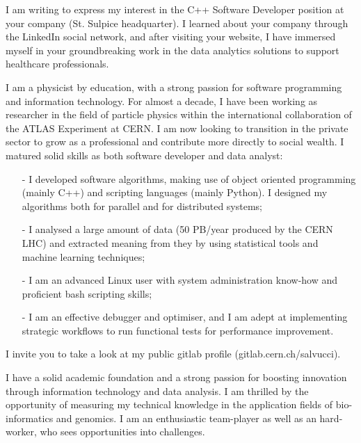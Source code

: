 \documentclass[11pt, a4paper]{\TEXPATH awesome-cv}
\begin{document}
\makecvheader %
\makelettertitle %


\begin{cvletter}

  I am writing to express my interest in the C++ Software Developer position at
  your company (St. Sulpice headquarter). I learned about your company through
  the LinkedIn social network, and after visiting your website, I have immersed
  myself in your groundbreaking work in the data analytics solutions to support
  healthcare professionals.

  I am a physicist by education, with a strong passion for software programming
  and information technology. For almost a decade, I have been working as
  researcher in the field of particle physics within the international
  collaboration of the ATLAS Experiment at CERN. I am now looking to transition
  in the private sector to grow as a professional and contribute more directly
  to social wealth. I matured solid skills as both software developer and data
  analyst:
  \begin{itemize}
  \item[-] I developed software algorithms, making use of object oriented
    programming (mainly C++) and scripting languages (mainly Python). I
    designed my algorithms both for parallel and for distributed systems;
  \item[-] I analysed a large amount of data (50 PB/year produced by the
    CERN LHC) and extracted meaning from they by using statistical tools and
    machine learning techniques;
  \item[-] I am an advanced Linux user with system administration know-how and
    proficient bash scripting skills;
  \item[-] I am an effective debugger and optimiser, and I am adept at
    implementing strategic workflows to run functional tests for performance
    improvement.
  \end{itemize}
  I invite you to take a look at my public gitlab profile
  (gitlab.cern.ch/salvucci).
  
  I have a solid academic foundation and a strong passion for boosting
  innovation through information technology and data analysis. I am thrilled by
  the opportunity of measuring my technical knowledge in the application fields
  of bio-informatics and genomics. I am an enthusiastic team-player as well as
  an hard-worker, who sees opportunities into challenges.
  

\end{cvletter}
\end{document}
